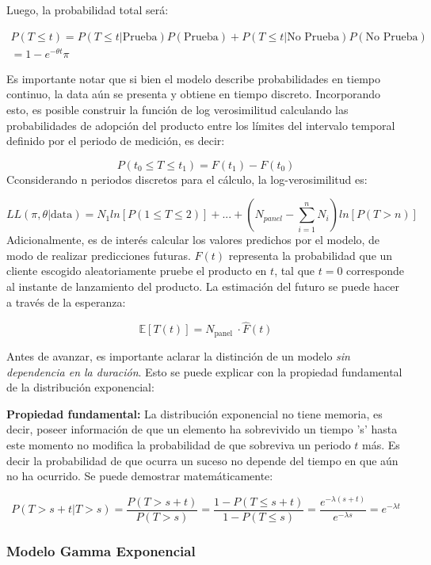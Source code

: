\documentclass[
]{book}
\begin{document}
Luego, la probabilidad total será:

\[
\begin{array}{c}
P(T \leq t) = P(T \leq t | \text{Prueba}) P(\text{Prueba}) + P(T \leq t | \text{No Prueba}) P(\text{No Prueba}) \\
= 1 - e^{-\theta t}\pi
\end{array}
\]

Es importante notar que si bien el modelo describe probabilidades en
tiempo continuo, la data aún se presenta y obtiene en tiempo discreto.
Incorporando esto, es posible construir la función de log verosimilitud
calculando las probabilidades de adopción del producto entre los límites
del intervalo temporal definido por el periodo de medición, es decir:

\[P(t_0 \leq T \leq t_1) = F(t_1) - F(t_0)\] Cconsiderando n periodos
discretos para el cálculo, la log-verosimilitud es:

\[LL(\pi,\theta|\text{data}) = N_1 ln[P(1\leq T \leq 2)] + ... + (N_{panel} - \sum_{i=1}^{n}N_i)ln[P(T>n)]\]
Adicionalmente, es de interés calcular los valores predichos por el
modelo, de modo de realizar predicciones futuras. \(F(t)\) representa la
probabilidad que un cliente escogido aleatoriamente pruebe el producto
en \(t\), tal que \(t=0\) corresponde al instante de lanzamiento del
producto. La estimación del futuro se puede hacer a través de la
esperanza:

\[\mathbb{E}[T(t)] = N_{\text{panel }} \cdot \hat{F}(t) \]

Antes de avanzar, es importante aclarar la distinción de un modelo \emph{sin
dependencia en la duración}. Esto se puede explicar con la propiedad
fundamental de la distribución exponencial:

\textbf{Propiedad fundamental:} La distribución exponencial no tiene memoria,
es decir, poseer información de que un elemento ha sobrevivido un tiempo
's' hasta este momento no modifica la probabilidad de que sobreviva un
periodo \(t\) más. Es decir la probabilidad de que ocurra un suceso no
depende del tiempo en que aún no ha ocurrido. Se puede demostrar
matemáticamente:

\[P(T > s + t|T>s) = \frac{P(T> s+t)}{P(T> s)} = \frac{1-P(T \leq s+t)}{1-P(T \leq s)}= \frac{e^{-\lambda(s+t)}}{e^{-\lambda s}} = e^{-\lambda t}\]

\subsubsection{Modelo Gamma Exponencial}\label{modelo-gamma-exponencial}
\end{document}
